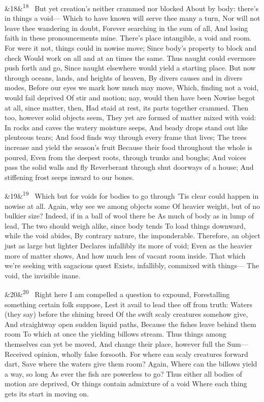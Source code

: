 \documentclass[12pt]{article}
\newcommand{\para}[1][]{\par\noindent\ifx&#1&\else\textsuperscript{\footnotesize #1}~\fi}
\begin{document}
\para[18] But yet creation's neither crammed nor blocked About by body: there's in things a void--- Which to have known will serve thee many a turn, Nor will not leave thee wandering in doubt, Forever searching in the sum of all, And losing faith in these pronouncements mine. There's place intangible, a void and room. For were it not, things could in nowise move; Since body's property to block and check Would work on all and at an times the same. Thus naught could evermore push forth and go, Since naught elsewhere would yield a starting place. But now through oceans, lands, and heights of heaven, By divers causes and in divers modes, Before our eyes we mark how much may move, Which, finding not a void, would fail deprived Of stir and motion; nay, would then have been Nowise begot at all, since matter, then, Had staid at rest, its parts together crammed. Then too, however solid objects seem, They yet are formed of matter mixed with void: In rocks and caves the watery moisture seeps, And beady drops stand out like plenteous tears; And food finds way through every frame that lives; The trees increase and yield the season's fruit Because their food throughout the whole is poured, Even from the deepest roots, through trunks and boughs; And voices pass the solid walls and fly Reverberant through shut doorways of a house; And stiffening frost seeps inward to our bones.

\para[19] Which but for voids for bodies to go through 'Tis clear could happen in nowise at all. Again, why see we among objects some Of heavier weight, but of no bulkier size? Indeed, if in a ball of wool there be As much of body as in lump of lead, The two should weigh alike, since body tends To load things downward, while the void abides, By contrary nature, the imponderable. Therefore, an object just as large but lighter Declares infallibly its more of void; Even as the heavier more of matter shows, And how much less of vacant room inside. That which we're seeking with sagacious quest Exists, infallibly, commixed with things--- The void, the invisible inane.

\para[20] Right here I am compelled a question to expound, Forestalling something certain folk suppose, Lest it avail to lead thee off from truth: Waters (they say) before the shining breed Of the swift scaly creatures somehow give, And straightway open sudden liquid paths, Because the fishes leave behind them room To which at once the yielding billows stream. Thus things among themselves can yet be moved, And change their place, however full the Sum--- Received opinion, wholly false forsooth. For where can scaly creatures forward dart, Save where the waters give them room? Again, Where can the billows yield a way, so long As ever the fish are powerless to go? Thus either all bodies of motion are deprived, Or things contain admixture of a void Where each thing gets its start in moving on.
\end{document}
